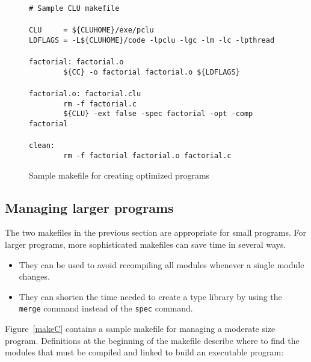 \begin{figure}[hbt]
\small
\begin{boxdisplay}
\verb`# Sample CLU makefile`\\
\verb``\\
\verb`CLU     = ${CLUHOME}/exe/pclu                             `\\
\verb`LDFLAGS = -L${CLUHOME}/code -lpclu -lgc -lm -lc -lpthread `\\
\verb``\\
\verb`factorial: factorial.o`\\
\verb`        ${CC} -o factorial factorial.o ${LDFLAGS}`\\
\verb``\\
\verb`factorial.o: factorial.clu`\\
\verb`        rm -f factorial.c`\\
\verb`        ${CLU} -ext false -spec factorial -opt -comp factorial`\\
\verb``\\
\verb`clean:`\\
\verb`        rm -f factorial factorial.o factorial.c`\\
\end{boxdisplay}
\caption{Sample makefile for creating optimized programs}
\label{makeB}
\end{figure}

\subsection{Managing larger programs}

The two makefiles in the previous section are appropriate for small programs.
For larger programs, more sophisticated makefiles can save time in several
ways.

\begin{itemize}
\item
They can be used to avoid recompiling all modules whenever a single module
changes.
\item
They can shorten the time needed to create a type library by using the {\tt
merge} command instead of the {\tt spec} command.
\end{itemize}

Figure~\ref{makeC} contains a sample makefile for managing a moderate size
program.  Definitions at the beginning of the makefile describe where to find
the modules that must be compiled and linked to build an executable program:

